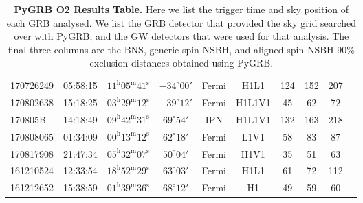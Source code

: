 \documentclass[11pt]{cuthesis}
\begin{document}
\begin{landscape}
\begin{table}
\begin{tabular}{l c  c  c  c  c  c  c  c c |}
170726249 & 05:58:15  & $11^{\mathrm{h}}05^{\mathrm{m}}41^{\mathrm{s}}$ & $-34^{\circ}00'$ & Fermi   & H1L1   & 124 & 152 & 207 \\
170802638 & 15:18:25  & $03^{\mathrm{h}}29^{\mathrm{m}}12^{\mathrm{s}}$ & $-39^{\circ}12'$ & Fermi   & H1L1V1 & 45  & 62  & 72 \\
170805B   & 14:18:49  & $09^{\mathrm{h}}42^{\mathrm{m}}31^{\mathrm{s}}$ & $69^{\circ}54'$ &  IPN     & H1L1V1 & 132 & 163 & 218 \\
170808065 & 01:34:09  & $00^{\mathrm{h}}13^{\mathrm{m}}12^{\mathrm{s}}$ & $62^{\circ}18'$ &  Fermi   & L1V1   & 58  & 83  & 87 \\
170817908 & 21:47:34  & $05^{\mathrm{h}}32^{\mathrm{m}}07^{\mathrm{s}}$ & $50^{\circ}04'$ &  Fermi   & H1V1   & 35  & 51  & 63 \\
161210524 & 12:33:54  & $18^{\mathrm{h}}52^{\mathrm{m}}29^{\mathrm{s}}$ & $63^{\circ}03'$ &  Fermi   & H1L1   & 61  & 72  & 112 \\
161212652 & 15:38:59  & $01^{\mathrm{h}}39^{\mathrm{m}}36^{\mathrm{s}}$ & $68^{\circ}12'$ &  Fermi   & H1     & 49  & 59  & 60 \\
\end{tabular}
\caption{\textbf{PyGRB O2 Results Table.} Here we list the trigger time and sky position of each GRB analysed. We list the GRB detector that provided the sky grid searched over with PyGRB, and the GW detectors that were used for that analysis. The final three columns are the BNS, generic spin NSBH, and aligned spin NSBH 90\% exclusion distances obtained using PyGRB. }
 \label{tab:grbs}
\end{table}
\end{landscape}
\end{document}
